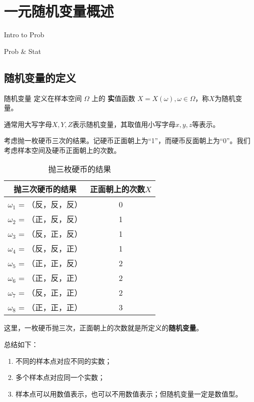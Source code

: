 \chapter{一元随机变量概述}
\begin{introduction}
  \item Intro to Prob
  \item Prob $\&$ Stat
\end{introduction}
\section{随机变量的定义}

\begin{definition}{随机变量} \label{def: random_variable} 
定义在样本空间 $\Omega$ 上的 {\textbf 实值函数} $X=X(\omega),\omega \in \Omega$，称$X$为随机变量。
\end{definition}
\begin{remark}
通常用大写字母$X,Y,Z$表示随机变量，其取值用小写字母$x,y,z$等表示。
\end{remark}

\begin{example}
考虑抛一枚硬币三次的结果。记硬币正面朝上为“1”，而硬币反面朝上为“0”。我们考虑样本空间及硬币正面朝上的次数。
\begin{table}[ht]
  \centering
  \caption{抛三枚硬币的结果}\label{tab:Lect3_3coins}
  \begin{tabular}{cc}
    \toprule
    抛三次硬币的结果 & 正面朝上的次数$X$ \\
    \midrule
    $\omega_1$ = （反，反，反） & 0\\
    $\omega_2$ = （正，反，反） & 1\\
    $\omega_3$ = （反，正，反） & 1\\
    $\omega_4$ = （反，反，正） & 1\\
    $\omega_5$ = （正，正，反） & 2\\
    $\omega_6$ = （正，反，正） & 2\\
    $\omega_7$ = （反，正，正） & 2\\
    $\omega_8$ = （正，正，正） & 3\\
    \bottomrule
  \end{tabular}
\end{table}

这里，一枚硬币抛三次，正面朝上的次数就是所定义的{\textbf{随机变量}}。
\end{example}

\begin{remark}
总结如下：
    \begin{enumerate}
    \item 不同的样本点对应不同的实数；
    \item 多个样本点对应同一个实数；
    \item 样本点可以用数值表示，也可以不用数值表示；但随机变量一定是数值型。
    \end{enumerate}
\end{remark}


